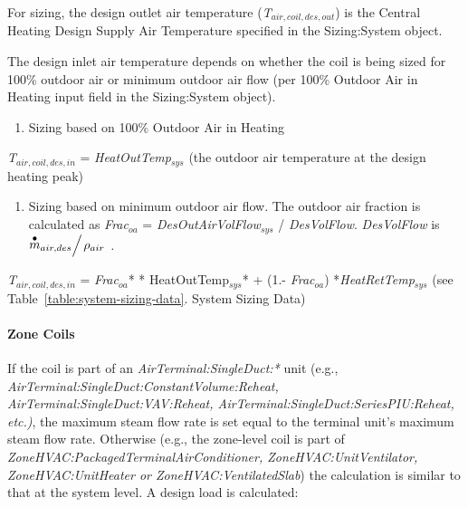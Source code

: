 For sizing, the design outlet air temperature (\emph{T\(_{air,coil,des,out}\)}) is the Central Heating Design Supply Air Temperature specified in the Sizing:System object.

The design inlet air temperature depends on whether the coil is being sized for 100\% outdoor air or minimum outdoor air flow (per 100\% Outdoor Air in Heating input field in the Sizing:System object).

\begin{enumerate}
\def\labelenumi{\arabic{enumi})}
\tightlist
\item
  Sizing based on 100\% Outdoor Air in Heating
\end{enumerate}

\emph{T\(_{air,coil,des,in}\)} = \emph{HeatOutTemp\(_{sys}\)} (the outdoor air temperature at the design heating peak)

\begin{enumerate}
\def\labelenumi{\arabic{enumi})}
\setcounter{enumi}{1}
\tightlist
\item
  Sizing based on minimum outdoor air flow. The outdoor air fraction is calculated as \emph{Frac}\(_{oa}\) = \emph{DesOutAirVolFlow\(_{sys}\)} / \emph{DesVolFlow}. \emph{DesVolFlow} is \({{{{\mathop m\limits^ \bullet }_{air,des}}} \mathord{\left/ {\vphantom {{{{\mathop m\limits^ \bullet }_{air,des}}} {{\rho_{air}}}}} \right. } {{\rho_{air}}}}\) \emph{.}
\end{enumerate}

\emph{T\(_{air,coil,des,in}\)} = \emph{Frac}\(_{oa}\)* * HeatOutTemp\(_{sys}\)* + (1.- \emph{Frac\(_{oa}\)}) *\emph{HeatRetTemp\(_{sys}\)} (see Table~\ref{table:system-sizing-data}. System Sizing Data)

\paragraph{Zone Coils}\label{zone-coils-2}

If the coil is part of an \emph{AirTerminal:SingleDuct:*} unit (e.g., \emph{Air\-Terminal:\-Single\-Duct:\-Constant\-Volume\-:Re\-heat, Air\-Terminal:\-Single\-Duct:\-VAV:\-Re\-heat, Air\-Terminal:\-Single\-Duct:\-Series\-PIU:\-Re\-heat, etc.)}, the maximum steam flow rate is set equal to the terminal unit's maximum steam flow rate. Otherwise (e.g., the zone-level coil is part of \emph{Zone\-HVAC:\-Packaged\-Terminal\-Air\-Conditioner, Zone\-HVAC\-:Unit\-Ventilator, Zone\-HVAC\-:Unit\-Heater or Zone\-HVAC:\-Ventilated\-Slab}) the calculation is similar to that at the system level. A design load is calculated:

